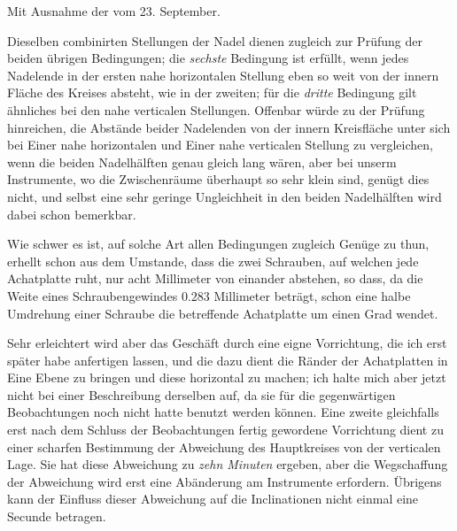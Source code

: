 \expandafter\def\csname HistoricalNoteText454\endcsname{Mit Ausnahme der vom 23. September.}%
\par\clearpage
{}
Dieselben combinirten Stellungen der Nadel dienen zugleich zur Prüfung der beiden übrigen Bedingungen; die \textit{sechste} Bedingung ist erfüllt, wenn jedes Nadelende in der ersten nahe horizontalen Stellung eben so weit von der innern Fläche des Kreises absteht, wie in der zweiten; für die \textit{dritte} Bedingung gilt ähnliches bei den nahe verticalen Stellungen. Offenbar würde zu der Prüfung hinreichen, die Abstände beider Nadelenden von der innern Kreisfläche unter sich bei Einer nahe horizontalen und Einer nahe verticalen Stellung zu vergleichen, wenn die beiden Nadelhälften genau gleich lang wären, aber bei unserm Instrumente, wo die Zwischenräume überhaupt so sehr klein sind, genügt dies nicht, und selbst eine sehr geringe Ungleichheit in den beiden Nadelhälften wird dabei schon bemerkbar.

Wie schwer es ist, auf solche Art allen Bedingungen zugleich Genüge zu thun, erhellt schon aus dem Umstande, dass die zwei Schrauben, auf welchen jede Achatplatte ruht, nur acht Millimeter von einander abstehen, so dass, da die Weite eines Schraubengewindes $0.283$ Millimeter beträgt, schon eine halbe Umdrehung einer Schraube die betreffende Achatplatte um einen Grad wendet.

Sehr erleichtert wird aber das Geschäft durch eine eigne Vorrichtung, die ich erst später habe anfertigen lassen, und die dazu dient die Ränder der Achatplatten in Eine Ebene zu bringen und diese horizontal zu machen; ich halte mich aber jetzt nicht bei einer Beschreibung derselben auf, da sie für die gegenwärtigen Beobachtungen noch nicht hatte benutzt werden können. Eine zweite gleichfalls erst nach dem Schluss der Beobachtungen fertig gewordene Vorrichtung dient zu einer scharfen Bestimmung der Abweichung des Hauptkreises von der verticalen Lage. Sie hat diese Abweichung zu \textit{zehn Minuten} ergeben, aber die Wegschaffung der Abweichung wird erst eine Abänderung am Instrumente erfordern. Übrigens kann der Einfluss dieser Abweichung auf die Inclinationen nicht einmal eine Secunde betragen.

